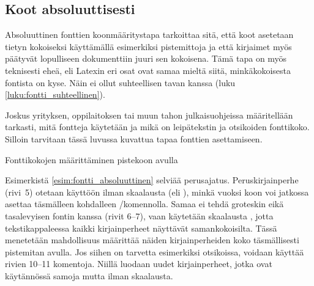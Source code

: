 \subsection{Koot absoluuttisesti}
\label{luku:fontti_absoluuttinen}

Absoluuttinen fonttien koonmääritystapa tarkoittaa sitä, että koot
asetetaan tietyn kokoiseksi käyttämällä esimerkiksi pistemittoja ja että
kirjaimet myös päätyvät lopulliseen dokumenttiin juuri sen kokoisena.
Tämä tapa on myös teknisesti eheä, eli Latexin eri osat ovat samaa
mieltä siitä, minkäkokoisesta fontista on kyse. Näin ei ollut
suhteellisen tavan kanssa (luku \ref{luku:fontti_suhteellinen}).

Joskus yrityksen, oppilaitoksen tai muun tahon julkaisu\-ohjeissa
määritellään tarkasti, mitä fontteja käytetään ja mikä on leipätekstin
ja otsikoiden fonttikoko. Silloin tarvitaan tässä luvussa kuvattua tapaa
fonttien asettamiseen.

\begin{esimerkki}
\caption{Fonttikokojen määrittäminen pistekoon avulla}
\label{esim:fontti_absoluuttinen}
\end{esimerkki}

Esimerkistä \ref{esim:fontti_absoluuttinen} selviää perus\-ajatus.
Peruskirjainperhe (rivi~5) otetaan käyttöön ilman skaalausta (eli
), minkä vuoksi koon voi jatkossa asettaa täsmälleen
kohdalleen \-/komennolla. Samaa ei tehdä groteskin
eikä tasalevyisen fontin kanssa (rivit 6--7), vaan käytetään skaalausta
, jotta tekstikappaleessa kaikki kirjainperheet
näyttävät samankokoisilta. Tässä menetetään mahdollisuus määrittää
näiden kirjainperheiden koko täsmällisesti pistemitan avulla. Jos siihen
on tarvetta esimerkiksi otsikoissa, voidaan käyttää rivien 10--11
komentoja. Niillä luodaan uudet kirjainperheet, jotka ovat käytännössä
samoja mutta ilman skaalausta.

